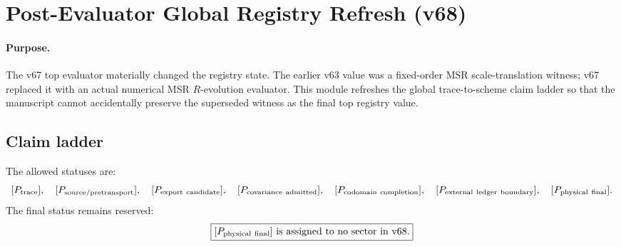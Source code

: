 
\section{Post-Evaluator Global Registry Refresh (v68)}
\label{sec:v68-post-evaluator-registry}

\paragraph{Purpose.}
The v67 top evaluator materially changed the registry state.  The earlier v63 value was a fixed-order MSR scale-translation witness; v67 replaced it with an actual numerical MSR $R$-evolution evaluator.  This module refreshes the global trace-to-scheme claim ladder so that the manuscript cannot accidentally preserve the superseded witness as the final top registry value.

\begin{center}
\end{center}

\subsection{Claim ladder}
The allowed statuses are:
\[
[P_{\rm trace}],\quad
[P_{\rm source/pretransport}],\quad
[P_{\rm export\ candidate}],\quad
[P_{\rm covariance\ admitted}],\quad
[P_{\rm codomain\ completion}],\quad
[P_{\rm external\ ledger\ boundary}],\quad
[P_{\rm physical\ final}].
\]
The final status remains reserved:
\[
  \boxed{[P_{\rm physical\ final}]\ \text{is assigned to no sector in v68.}}
\]

